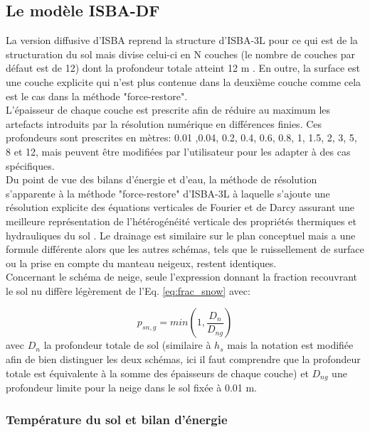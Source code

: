 \subsection{{\selectfont Le modèle ISBA-DF}}
\label{sec:ISBA-DF}


\noindent La version diffusive d'ISBA reprend la structure d'ISBA-3L pour ce qui est de la structuration du sol mais divise celui-ci en N couches (le nombre de couches par défaut est de 12) dont la profondeur totale atteint 12 m \citep{decharme2013}. En outre, la surface est une couche explicite qui n'est plus contenue dans la deuxième couche comme cela est le cas dans la méthode "force-restore".\\
%
L'épaisseur de chaque couche est prescrite afin de réduire au maximum les artefacts introduits par la résolution numérique en différences finies. Ces profondeurs sont prescrites en mètres: 0.01 ,0.04, 0.2, 0.4, 0.6, 0.8, 1, 1.5, 2, 3, 5, 8 et 12, mais peuvent être modifiées par l'utilisateur pour les adapter à des cas spécifiques.\\

\noindent Du point de vue des bilans d'énergie et d'eau, la méthode de résolution s'apparente à la méthode "force-restore" d'ISBA-3L à laquelle s'ajoute une résolution explicite des équations verticales de Fourier et de Darcy assurant une meilleure représentation de l'hétérogénéité verticale des propriétés thermiques et hydrauliques du sol \citep{decharme2016}. 
Le drainage est similaire sur le plan conceptuel mais a une formule différente alors que les autres schémas, tels que le ruissellement de surface ou la prise en compte du manteau neigeux, restent identiques. \\

\noindent Concernant le schéma de neige, seule l'expression donnant la fraction recouvrant le sol nu diffère légèrement de l'Eq. \ref{eq:frac_snow} avec:

\begin{equation}
p_{sn,g} = min(1, \frac{D_{n}}{D_{ng}})
\end{equation}
avec $D_{n}$ la profondeur totale de sol (similaire à $h_{s}$ mais la notation est modifiée afin de bien distinguer les deux schémas, ici il faut comprendre que la profondeur totale est équivalente à la somme des épaisseurs de chaque couche) et $D_{ng}$ une profondeur limite pour la neige dans le sol fixée à 0.01 m. \\

\subsubsection{{\selectfont Température du sol et bilan d'énergie}}


